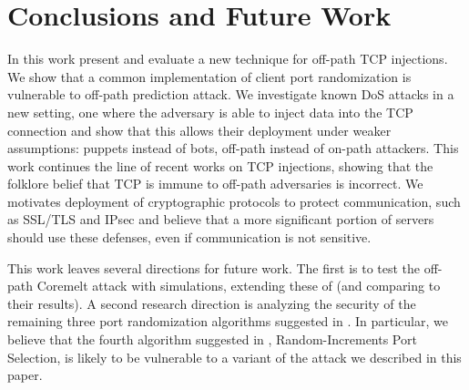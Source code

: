 \documentclass[conference]{IEEEtran}
\newcommand{\ignore}[1]{}
\begin{document}
\ignore{


We next consider a different approach, allowing the browser to validate the responses it receives; this will protect against the data integrity attacks in Section \ref{exploiting:S} where the attacker `feeds' the browser with a fake response. The idea is that the browser adds a random identifying header to each HTTP request. The HTTP headers that the client specified are echoed in the server response and allow the client to validate the data he receives. This header will make injection much difficult since the attacker does not receive the identifier; she would need to inject her data in the middle of the server's response. This would also protect against other attacks such as Klein's response smuggling \cite{}.
}































\section{Conclusions and Future Work} \label{conclusions}
In this work present and evaluate a  new technique for off-path TCP injections. We show that a common implementation of client port randomization is vulnerable to off-path prediction attack. We investigate known DoS attacks in a new setting, one where the adversary is able to inject data into the TCP connection and show that this allows their deployment under weaker assumptions: puppets instead of bots, off-path instead of on-path attackers. This work continues the line of recent works on TCP injections, showing that the folklore belief that TCP is immune to off-path adversaries is incorrect. We motivates deployment of cryptographic protocols to protect communication, such as SSL/TLS and IPsec and believe that a more significant portion of servers should use these defenses, even if communication is not sensitive. 

This work leaves several directions for future work. The first is to test the off-path Coremelt attack with simulations, extending these of \cite{conf/esorics/StuderP09} (and comparing to their results). A second research direction is analyzing the security of the remaining three port randomization algorithms suggested in \cite{rfc6056}. In particular, we believe that the fourth algorithm suggested in \cite{rfc6056}, Random-Increments Port Selection, is likely to be vulnerable to a variant of the attack we described in this paper.






 
\end{document}

